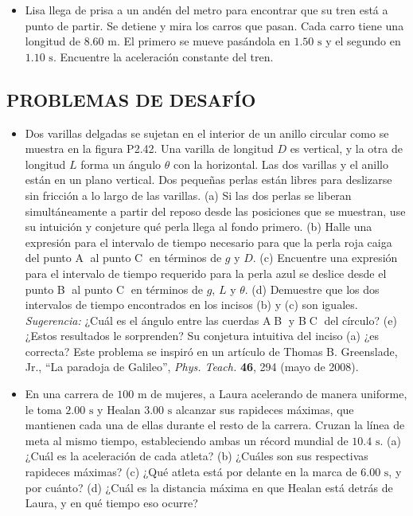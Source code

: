 \documentclass[11pt,a4paper]{article}
\begin{document}
\begin{itemize}
    \item[\textbf{41.}] Lisa llega de prisa a un andén del metro para encontrar que su tren está a punto de partir. Se detiene y mira los carros que pasan. Cada carro tiene una longitud de $8.60 \text{ m}$. El primero se mueve pasándola en $1.50 \text{ s}$ y el segundo en $1.10 \text{ s}$. Encuentre la aceleración constante del tren.
    \vspace*{6cm}
\end{itemize}

\newpage

\subsection*{PROBLEMAS DE DESAFÍO}

\begin{itemize}
    \item[\textbf{42.}] Dos varillas delgadas se sujetan en el interior de un anillo circular como se muestra en la figura P2.42. Una varilla de longitud $D$ es vertical, y la otra de longitud $L$ forma un ángulo $\theta$ con la horizontal. Las dos varillas y el anillo están en un plano vertical. Dos pequeñas perlas están libres para deslizarse sin fricción a lo largo de las varillas. (a) Si las dos perlas se liberan simultáneamente a partir del reposo desde las posiciones que se muestran, use su intuición y conjeture qué perla llega al fondo primero. (b) Halle una expresión para el intervalo de tiempo necesario para que la perla roja caiga del punto \textcircled{A} al punto \textcircled{C} en términos de $g$ y $D$. (c) Encuentre una expresión para el intervalo de tiempo requerido para la perla azul se deslice desde el punto \textcircled{B} al punto \textcircled{C} en términos de $g$, $L$ y $\theta$. (d) Demuestre que los dos intervalos de tiempo encontrados en los incisos (b) y (c) son iguales. \textit{Sugerencia:} ¿Cuál es el ángulo entre las cuerdas \textcircled{A}\textcircled{B} y \textcircled{B}\textcircled{C} del círculo? (e) ¿Estos resultados le sorprenden? Su conjetura intuitiva del inciso (a) ¿es correcta? Este problema se inspiró en un artículo de Thomas B. Greenslade, Jr., ``La paradoja de Galileo'', \textit{Phys. Teach.} \textbf{46}, 294 (mayo de 2008).
    \vspace*{8cm}

    \item[\textbf{43.}] En una carrera de $100 \text{ m}$ de mujeres, a Laura acelerando de manera uniforme, le toma $2.00 \text{ s}$ y Healan $3.00 \text{ s}$ alcanzar sus rapideces máximas, que mantienen cada una de ellas durante el resto de la carrera. Cruzan la línea de meta al mismo tiempo, estableciendo ambas un récord mundial de $10.4 \text{ s}$. (a) ¿Cuál es la aceleración de cada atleta? (b) ¿Cuáles son sus respectivas rapideces máximas? (c) ¿Qué atleta está por delante en la marca de $6.00 \text{ s}$, y por cuánto? (d) ¿Cuál es la distancia máxima en que Healan está detrás de Laura, y en qué tiempo eso ocurre?
    \vspace*{8cm}


\end{itemize}
\end{document}
